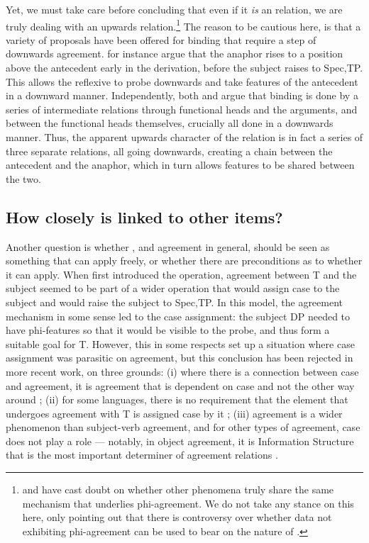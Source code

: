 \documentclass[output=paper
,modfonts
,nonflat]{langsci/langscibook}
\begin{document}
Yet, we must take care before concluding that even if it \emph{is} an {\agr} relation, we are truly dealing with an upwards {\agr} relation.\footnote{\citet{Preminger2013} and \citet{premingerpolinsky2015} have cast doubt on whether other phenomena truly share the same mechanism that underlies phi-agreement.
	We do not take any stance on this here, only pointing out that there is controversy over whether data not exhibiting phi-agreement can be used to bear on the nature of {\agr}.}
The reason to be cautious here, is that a variety of proposals have been offered for binding that require a step of downwards agreement.
\citet{rooryckvandenwyngaerd} for instance argue that the anaphor rises to a position above the antecedent early in the derivation, before the subject raises to Spec,TP.
This allows the reflexive to probe downwards and take features of the antecedent in a downward manner.
Independently, both \citet{reuland2001,reuland2011} and \citet{kratzer2009} argue that binding is done by a series of intermediate relations through functional heads and the arguments, and between the functional heads themselves, crucially all done in a downwards manner.
Thus, the apparent upwards character of the {\agr} relation is in fact a series of three separate {\agr} relations, all going downwards, creating a chain between the antecedent and the anaphor, which in turn allows features to be shared between the two.

\subsection{How closely is {\agr} linked to other items?}
\label{sec:parasitic}

Another question is whether {\agr}, and agreement in general, should be seen as something that can apply freely, or whether there are preconditions as to whether it can apply.
When \citet{Chomsky2000,Chomsky2001} first introduced the {\agr} operation, agreement between T and the subject seemed to be part of a wider operation that would assign case to the subject and would raise the subject to Spec,TP.
In this model, the agreement mechanism in some sense led to the case assignment: the subject DP needed to have phi-features so that it would be visible to the probe, and thus form a suitable goal for T.
However, this in some respects set up a situation where case assignment was parasitic on agreement, but this conclusion has been rejected in more recent work, on three grounds: (i) where there is a connection between case and agreement, it is agreement that is dependent on case and not the other way around \citep{Bobaljik2008,preminger2011,preminger2015}; (ii) for some languages, there is no requirement that the element that undergoes agreement with T is assigned case by it \citep{baker2008}; (iii) agreement is a wider phenomenon than subject-verb agreement, and for other types of agreement, case does not play a role --- notably, in object agreement, it is Information Structure that is the most important determiner of agreement relations \citep{dn2011}.
\end{document}
